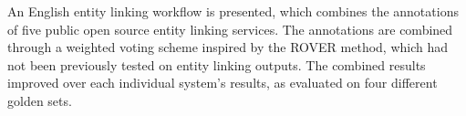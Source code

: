 An English entity linking workflow is presented, which combines the annotations of five public open source entity linking services. The annotations are combined through a weighted voting scheme inspired by the ROVER method, which had not been previously tested on entity linking outputs. The combined results improved over each individual system's results, as evaluated on four different golden sets.
